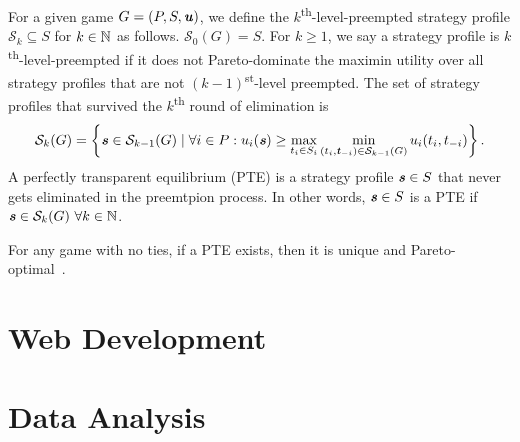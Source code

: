 \begin{definition}
  For a given game $G = (P, S, \boldsymbol{\mathit{u}})$, we define the $k$\textsuperscript{th}-level-preempted strategy profile $\mathcal{S}_k \subseteq S$ for $k \in \mathbb{N}$ as follows.
  $\mathcal{S}_0(G) = S$.
  For $k \ge 1$, we say a strategy profile is $k$\textsuperscript{th}-level-preempted if it does not Pareto-dominate the maximin utility over all strategy profiles that are not $(k-1)$\textsuperscript{st}-level preempted.
  The set of strategy profiles that survived the $k$\textsuperscript{th} round of elimination is
  \[
    \mathcal{S}_k(G) = \left\{\boldsymbol{\mathit{s}} \in \mathcal{S}_{k-1}(G) \mid \forall i \in P: u_i(\boldsymbol{\mathit{s}}) \ge \max_{t_i \in S_i}\min_{(t_i, \boldsymbol{\mathit{t}}_{-i}) \in \mathcal{S}_{k-1}(G)} u_i(t_i, t_{-i})\right\}.
  \]
  A perfectly transparent equilibrium (PTE) is a strategy profile $\boldsymbol{\mathit{s}} \in S$ that never gets eliminated in the preemtpion process.
  In other words, $\boldsymbol{\mathit{s}} \in S$ is a PTE if $\boldsymbol{\mathit{s}} \in \mathcal{S}_k(G)\ \forall k \in \mathbb{N}$.
\end{definition}

For any game with no ties, if a PTE exists, then it is unique and Pareto-optimal~\cite{Fourny20}.

\section{Web Development}
\section{Data Analysis}
